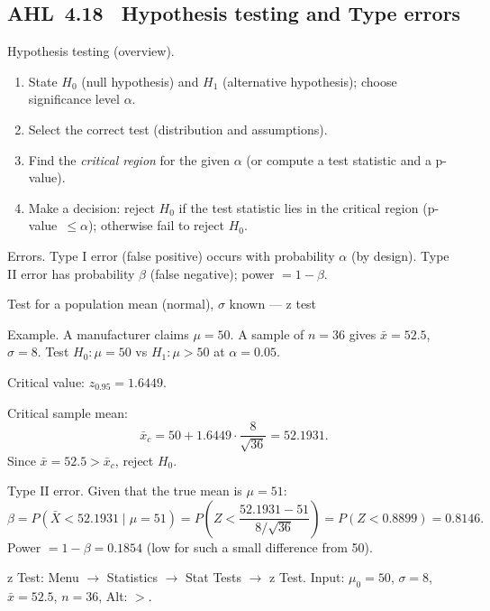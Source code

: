 \documentclass[11pt]{article}
\newcommand{\pvalue}{\textit{p}-value}
\newcommand{\Hnull}{H_{0}}
\newcommand{\Halt}{H_{1}}
\def\textbf#1{#1}%
\def\textit#1{#1}%
\def\texttt#1{#1}%
\def\mathbf#1{#1}%
\newcommand{\tocsubsection}[1]{\subsection{#1}}
\begin{document}
\tocsubsection{AHL 4.18 \; Hypothesis testing and Type errors}
\begin{keyideas}
\textbf{Hypothesis testing (overview).}
\begin{enumerate}[itemsep=2pt]
  \item State $\Hnull$ (null hypothesis) and $\Halt$ (alternative hypothesis); choose significance level $\alpha$.
  \item Select the correct test (distribution and assumptions).
  \item Find the \emph{critical region} for the given $\alpha$ (or compute a test statistic and a \pvalue).
  \item Make a decision: reject $\Hnull$ if the test statistic lies in the critical region (\pvalue\ $\le \alpha$); otherwise fail to reject $\Hnull$.
\end{enumerate}
\textbf{Errors.} Type I error (false positive) occurs with probability $\alpha$ (by design). Type II error has probability $\beta$ (false negative); power $=1-\beta$.
\end{keyideas}

\textbf{Test for a population mean (normal), $\sigma$ known --- z test}

\begin{examplebox}
\textbf{Example.} A manufacturer claims $\mu = 50$. A sample of $n=36$ gives $\bar x = 52.5$, $\sigma = 8$. Test $\Hnull:\mu=50$ vs $\Halt:\mu>50$ at $\alpha=0.05$.

Critical value: $z_{0.95}=1.6449$.

Critical sample mean:
\[
\bar x_c = 50 + 1.6449\cdot\frac{8}{\sqrt{36}} = \mathbf{52.1931}.
\]
Since $\bar x = 52.5 > \bar x_c$, reject $\Hnull$.
\end{examplebox}

\begin{warningbox}
\textbf{Type II error.} Given that the true mean is $\mu=51$:
\[
\beta = P(\bar X < 52.1931 \mid \mu = 51) 
= P\!\left(Z < \frac{52.1931 - 51}{8/\sqrt{36}}\right) 
= P(Z < 0.8899) = \mathbf{0.8146}.
\]
Power $= 1 - \beta = \mathbf{0.1854}$ (low for such a small difference from 50).
\end{warningbox}

\begin{calctip}
\textbf{z Test:} \texttt{Menu $\rightarrow$ Statistics $\rightarrow$ Stat Tests $\rightarrow$ z Test}. Input: $\mu_0=50$, $\sigma=8$, $\bar x=52.5$, $n=36$, Alt: $>$.
\end{calctip}
\end{document}
